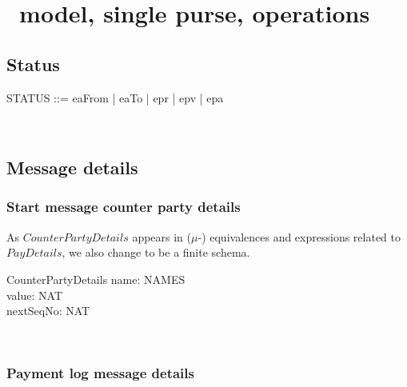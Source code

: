 \chapter{\Betw\ model, single purse, operations}\label{ch4}

\section{Status}

\begin{LFType}
\begin{zed}
   STATUS ::= eaFrom | eaTo | epr | epv | epa
\end{zed}~\end{LFType}

\section{Message details}\label{ch4.msgdetails}

\subsection{Start message counter party details}

As $CounterPartyDetails$ appears in ($\mu$-) equivalences
and expressions related to $PayDetails$, we also change
to be a finite schema.
%
\begin{LSDef}
\begin{schema}{CounterPartyDetails}
   name: NAMES \\
   value: NAT \\
   nextSeqNo: NAT
\end{schema}~\end{LSDef}

\subsection{Payment log message details}

